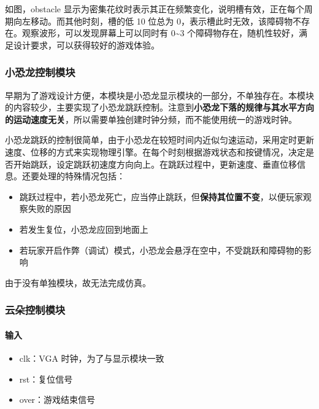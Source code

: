 \documentclass[hyperref,UTF8,12pt,a4paper]{ctexart}
\providecommand{\tightlist}{%
  \setlength{\itemsep}{0pt}\setlength{\parskip}{0pt}}
\begin{document}
如图，obstacle
显示为密集花纹时表示其正在频繁变化，说明槽有效，正在每个周期向左移动。而其他时刻，槽的低
10 位总为
0，表示槽此时无效，该障碍物不存在。观察波形，可以发现屏幕上可以同时有
0\textasciitilde3
个障碍物存在，随机性较好，满足设计要求，可以获得较好的游戏体验。

\hypertarget{ux5c0fux6050ux9f99ux63a7ux5236ux6a21ux5757}{%
\subsubsection{小恐龙控制模块}\label{ux5c0fux6050ux9f99ux63a7ux5236ux6a21ux5757}}

早期为了游戏设计方便，本模块是小恐龙显示模块的一部分，不单独存在。本模块的内容较少，主要实现了小恐龙跳跃控制。注意到\textbf{小恐龙下落的规律与其水平方向的运动速度无关}，所以需要单独创建时钟分频，而不能使用统一的游戏时钟。

小恐龙跳跃的控制很简单，由于小恐龙在较短时间内近似匀速运动，采用定时更新速度、位移的方式来实现物理引擎。在每个时刻根据游戏状态和按键情况，决定是否开始跳跃，设定跳跃初速度方向向上。在跳跃过程中，更新速度、垂直位移信息。还要处理的特殊情况包括：

\begin{itemize}
\tightlist
\item
  跳跃过程中，若小恐龙死亡，应当停止跳跃，但\textbf{保持其位置不变}，以便玩家观察失败的原因
\item
  若发生复位，小恐龙应回到地面上
\item
  若玩家开启作弊（调试）模式，小恐龙会悬浮在空中，不受跳跃和障碍物的影响
\end{itemize}

由于没有单独模块，故无法完成仿真。

\hypertarget{ux4e91ux6735ux63a7ux5236ux6a21ux5757}{%
\subsubsection{云朵控制模块}\label{ux4e91ux6735ux63a7ux5236ux6a21ux5757}}

\hypertarget{ux8f93ux5165-3}{%
\paragraph{输入}\label{ux8f93ux5165-3}}

\begin{itemize}
\tightlist
\item
  clk：VGA 时钟，为了与显示模块一致
\item
  rst：复位信号
\item
  over：游戏结束信号
\end{itemize}
\end{document}
